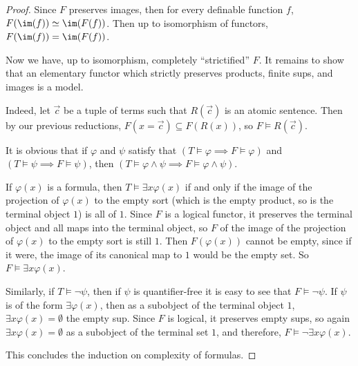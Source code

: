 \begin{proof}
  Since $F$ preserves images, then for every definable function $f$, $F(\im(f)) \simeq \im(F(f))$. Then up to isomorphism of functors, $F(\im(f)) = \im(F(f))$.

  Now we have, up to isomorphism, completely ``strictified'' $F$. It remains to show that an elementary functor which strictly preserves products, finite sups, and images is a model.

  Indeed, let $\vec{c}$ be a tuple of terms such that $R(\vec{c})$ is an atomic sentence. Then by our previous reductions, $F(x = \vec{c}) \subseteq F(R(x))$, so $F \models R(\vec{c})$.

  It is obvious that if $\varphi$ and $\psi$ satisfy that $(T \models \varphi \implies F \models \varphi)$ and $(T \models \psi \implies F \models \psi)$, then $(T \models \varphi \land \psi \implies F \models \varphi \land \psi)$.

  If $\varphi(x)$ is a formula, then $T \models \exists x \varphi(x)$ if and only if the image of the projection of $\varphi(x)$ to the empty sort (which is the empty product, so is the terminal object $1$) is all of $1$. Since $F$ is a logical functor, it preserves the terminal object and all maps into the terminal object, so $F$ of the image of the projection of $\varphi(x)$ to the empty sort is still $1$. Then $F(\varphi(x))$ cannot be empty, since if it were, the image of its canonical map to $1$ would be the empty set. So $F \models \exists x \varphi(x)$.

  Similarly, if $T \models \neg \psi$, then if $\psi$ is quantifier-free it is easy to see that $F \models \neg \psi$. If $\psi$ is of the form $\exists \varphi(x)$, then as a subobject of the terminal object $1$, $\exists x \varphi(x) = \emptyset$ the empty sup. Since $F$ is logical, it preserves empty sups, so again $\exists x \varphi(x) = \emptyset$ as a subobject of the terminal set $1$, and therefore, $F \models \neg \exists x \varphi(x)$.

  This concludes the induction on complexity of formulas.
\end{proof}


